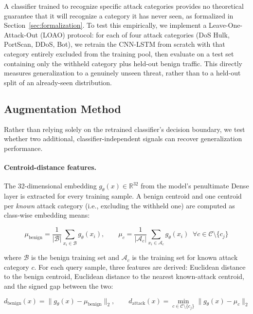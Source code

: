 \documentclass[11pt]{article}
\begin{document}
A classifier trained to recognize specific attack categories provides no theoretical guarantee that
it will recognize a category it has never seen, as formalized in Section~\ref{sec:formalization}.
To test this empirically, we implement a Leave-One-Attack-Out (LOAO) protocol: for each of four
attack categories (DoS Hulk, PortScan, DDoS, Bot), we retrain the CNN-LSTM from scratch with that
category entirely excluded from the training pool, then evaluate on a test set containing only the
withheld category plus held-out benign traffic. This directly measures generalization to a
genuinely unseen threat, rather than to a held-out split of an already-seen distribution.

\subsection{Augmentation Method}
\label{sec:augmentation}

Rather than relying solely on the retrained classifier's decision boundary, we test whether two
additional, classifier-independent signals can recover generalization performance.

\paragraph{Centroid-distance features.} The 32-dimensional embedding $g_\theta(x) \in \mathbb{R}^{32}$
from the model's penultimate Dense layer is extracted for every training sample. A benign centroid
and one centroid per \emph{known} attack category (i.e., excluding the withheld one) are computed as
class-wise embedding means:

\begin{equation}
\mu_{\text{benign}} = \frac{1}{|\mathcal{B}|} \sum_{x_i \in \mathcal{B}} g_\theta(x_i), \qquad
\mu_{c} = \frac{1}{|\mathcal{A}_c|} \sum_{x_i \in \mathcal{A}_c} g_\theta(x_i) \;\; \forall c \in \mathcal{C} \setminus \{c_j\}
\end{equation}

where $\mathcal{B}$ is the benign training set and $\mathcal{A}_c$ is the training set for known
attack category $c$. For each query sample, three features are derived: Euclidean distance to the
benign centroid, Euclidean distance to the nearest known-attack centroid, and the signed gap between
the two:

\begin{equation}
d_{\text{benign}}(x) = \lVert g_\theta(x) - \mu_{\text{benign}} \rVert_2, \qquad
d_{\text{attack}}(x) = \min_{c \in \mathcal{C} \setminus \{c_j\}} \lVert g_\theta(x) - \mu_c \rVert_2
\end{equation}
\end{document}
